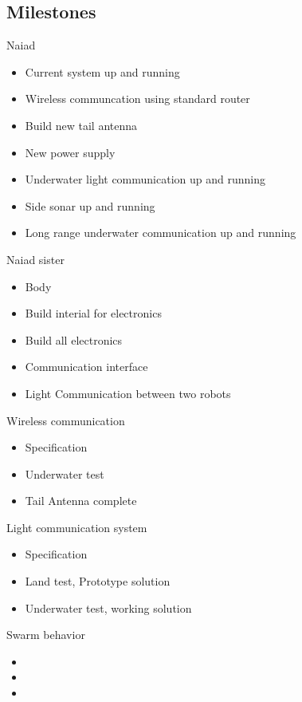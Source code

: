 \documentclass[a4paper, 10pt]{article} %
\begin{document}
\subsection{Milestones}
Naiad
\begin{itemize}
  \item Current system up and running
  \item Wireless communcation using standard router
   \item Build new tail antenna
  \item New power supply
   \item Underwater light communication up and running
    \item Side sonar up and running
    \item Long range underwater communication up and running
\end{itemize}

Naiad sister
\begin{itemize}
\item Body
\item Build interial for electronics
\item Build all electronics
\item Communication interface
\item Light Communication between two robots
\end{itemize}

Wireless communication
\begin{itemize}
\item Specification
\item Underwater test
\item Tail Antenna complete
\end{itemize}

Light communication system
\begin{itemize}
\item Specification
\item Land test, Prototype solution
\item Underwater test, working solution
\end{itemize}

Swarm behavior
\begin{itemize}
\item 
\item 
\item 
\end{itemize}
\end{document}

